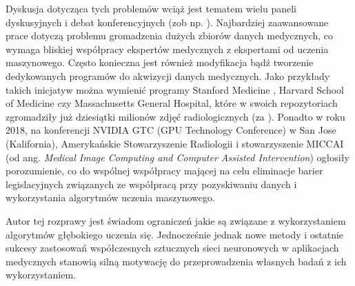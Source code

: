 Dyskusja dotycząca tych problemów wciąż jest tematem wielu paneli dyskusyjnych i debat konferencyjnych (zob np. \cite{NVIDIApanel}). Najbardziej zaawansowane prace dotyczą problemu gromadzenia dużych zbiorów danych medycznych, co wymaga bliskiej współpracy ekspertów medycznych z ekspertami od uczenia maszynowego. Często konieczna jest również modyfikacja bądź tworzenie dedykowanych programów do akwizycji danych medycznych. Jako przykłady takich inicjatyw można wymienić programy Stanford Medicine \cite{MedicalImageNet}, Harvard School of Medicine \cite{HMS} czy Massachusetts General Hospital, które w swoich repozytoriach zgromadziły już dziesiątki milionów zdjęć radiologicznych (za \cite{MGH}). Ponadto w roku 2018, na konferencji NVIDIA GTC (GPU Technology Conference) w San Jose (Kalifornia), Amerykańskie Stowarzyszenie Radiologii i stowarzyszenie MICCAI (od ang. \textit{Medical Image Computing and Computer Assisted Intervention}) ogłosiły porozumienie, co do wspólnej współpracy mającej na celu eliminacje barier legislacyjnych związanych ze współpracą przy pozyskiwaniu danych i wykorzystania algorytmów uczenia maszynowego.

Autor tej rozprawy jest świadom ograniczeń jakie są związane z wykorzystaniem algorytmów głębokiego uczenia się. Jednocześnie jednak nowe metody i ostatnie sukcesy zastosowań współczesnych sztucznych sieci neuronowych w aplikacjach medycznych stanowią silną motywację do przeprowadzenia własnych badań z ich wykorzystaniem.


    
